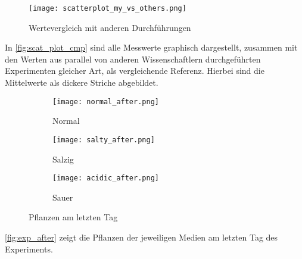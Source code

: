     \begin{figure}[h]
        \centering
        \texttt{[image: scatterplot\_my\_vs\_others.png]}
        \caption{Wertevergleich mit anderen Durchführungen}
        \label{fig:scat_plot_cmp}
    \end{figure}
    In \autoref{fig:scat_plot_cmp} sind alle Messwerte graphisch dargestellt, zusammen mit den Werten aus parallel von anderen Wissenschaftlern durchgeführten Experimenten gleicher Art, als vergleichende Referenz. Hierbei sind die Mittelwerte als dickere Striche abgebildet.

    \begin{figure}[h]
        \centering
        \begin{subfigure}{.32\textwidth}
            \texttt{[image: normal\_after.png]}
            \caption{Normal}
            \label{fig:normal_after}
        \end{subfigure}
        \begin{subfigure}{.32\textwidth}
            \texttt{[image: salty\_after.png]}
            \caption{Salzig}
            \label{fig:salty_after}
        \end{subfigure}
        \begin{subfigure}{.32\textwidth}
            \texttt{[image: acidic\_after.png]}
            \caption{Sauer}
            \label{fig:acidic_after}
        \end{subfigure}
        \caption{Pflanzen am letzten Tag}
        \label{fig:exp_after}
    \end{figure}
    \autoref{fig:exp_after} zeigt die Pflanzen der jeweiligen Medien am letzten Tag des Experiments.
